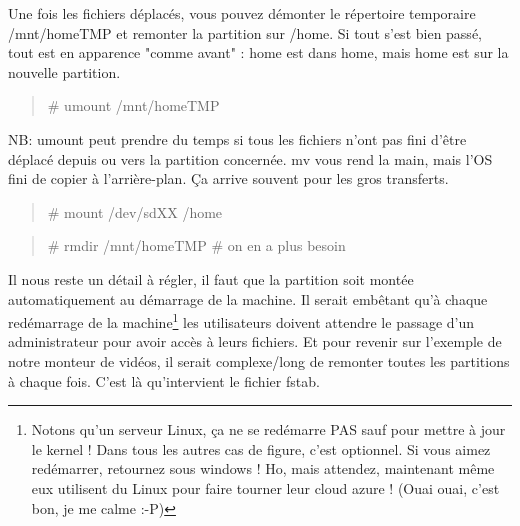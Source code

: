 \documentclass[a4paper,11pt]{article}
\newcommand{\commande}[1] {
    \begin{quote}
    \tt\raggedright #1
    \end{quote}
}
\begin{document}
\par Une fois les fichiers déplacés, vous pouvez démonter le répertoire temporaire /mnt/homeTMP et remonter la partition sur /home. Si tout s'est bien passé, tout est en apparence "comme avant" : home est dans home, mais home est sur la nouvelle partition.
\commande{\# umount /mnt/homeTMP}
\par NB: umount peut prendre du temps si tous les fichiers n'ont pas fini d'être déplacé depuis ou vers la partition concernée. mv vous rend la main, mais l'OS fini de copier à l'arrière-plan. Ça arrive souvent pour les gros transferts.
\commande{\# mount /dev/sdXX /home}
\commande{\# rmdir /mnt/homeTMP \# on en a plus besoin}
\par Il nous reste un détail à régler, il faut que la partition soit montée automatiquement au démarrage de la machine. Il serait embêtant qu'à chaque redémarrage de la machine\footnote{Notons qu'un serveur Linux, ça ne se redémarre PAS sauf pour mettre à jour le kernel ! Dans tous les autres cas de figure, c'est optionnel. Si vous aimez redémarrer, retournez sous windows ! Ho, mais attendez, maintenant même eux utilisent du Linux pour faire tourner leur cloud azure ! (Ouai ouai, c'est bon, je me calme :-P)} les utilisateurs doivent attendre le passage d'un administrateur pour avoir accès à leurs fichiers. Et pour revenir sur l'exemple de notre monteur de vidéos, il serait complexe/long de remonter toutes les partitions à chaque fois. C'est là qu'intervient le fichier fstab.
\end{document}

